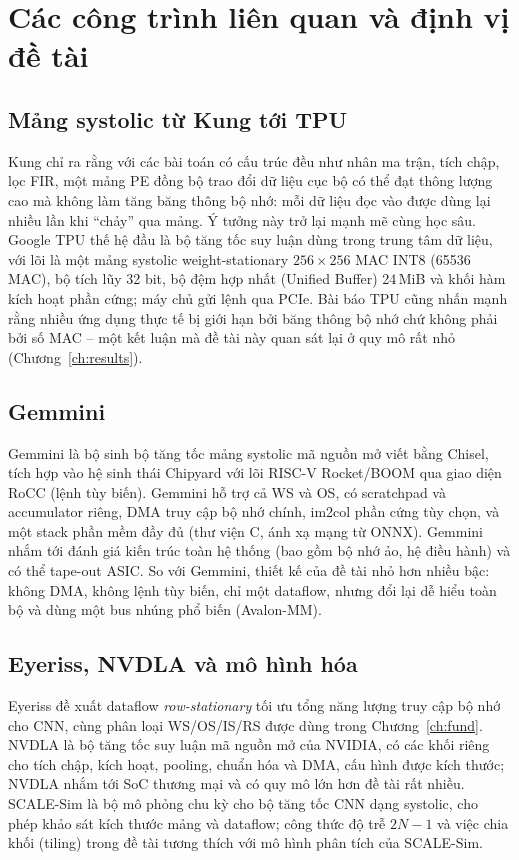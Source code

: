 \chapter{Các công trình liên quan và định vị đề tài}
\label{ch:related}

\section{Mảng systolic từ Kung tới TPU}
Kung \cite{kung1982} chỉ ra rằng với các bài toán có cấu trúc đều như nhân ma trận, tích chập, lọc FIR, một mảng PE đồng bộ trao đổi dữ liệu cục bộ có thể đạt thông lượng cao mà không làm tăng băng thông bộ nhớ: mỗi dữ liệu đọc vào được dùng lại nhiều lần khi ``chảy'' qua mảng. Ý tưởng này trở lại mạnh mẽ cùng học sâu. Google TPU thế hệ đầu \cite{jouppi2017tpu} là bộ tăng tốc suy luận dùng trong trung tâm dữ liệu, với lõi là một mảng systolic weight-stationary $256\times256$ MAC INT8 (\num{65536} MAC), bộ tích lũy 32 bit, bộ đệm hợp nhất (Unified Buffer) 24\,MiB và khối hàm kích hoạt phần cứng; máy chủ gửi lệnh qua PCIe. Bài báo TPU cũng nhấn mạnh rằng nhiều ứng dụng thực tế bị giới hạn bởi băng thông bộ nhớ chứ không phải bởi số MAC -- một kết luận mà đề tài này quan sát lại ở quy mô rất nhỏ (Chương~\ref{ch:results}).

\section{Gemmini}
Gemmini \cite{genc2021gemmini} là bộ sinh bộ tăng tốc mảng systolic mã nguồn mở viết bằng Chisel, tích hợp vào hệ sinh thái Chipyard với lõi RISC-V Rocket/BOOM qua giao diện RoCC (lệnh tùy biến). Gemmini hỗ trợ cả WS và OS, có scratchpad và accumulator riêng, DMA truy cập bộ nhớ chính, im2col phần cứng tùy chọn, và một stack phần mềm đầy đủ (thư viện C, ánh xạ mạng từ ONNX). Gemmini nhắm tới đánh giá kiến trúc toàn hệ thống (bao gồm bộ nhớ ảo, hệ điều hành) và có thể tape-out ASIC. So với Gemmini, thiết kế của đề tài nhỏ hơn nhiều bậc: không DMA, không lệnh tùy biến, chỉ một dataflow, nhưng đổi lại dễ hiểu toàn bộ và dùng một bus nhúng phổ biến (Avalon-MM).

\section{Eyeriss, NVDLA và mô hình hóa}
Eyeriss \cite{chen2016eyeriss,chen2017eyerissjssc} đề xuất dataflow \emph{row-stationary} tối ưu tổng năng lượng truy cập bộ nhớ cho CNN, cùng phân loại WS/OS/IS/RS được dùng trong Chương~\ref{ch:fund}. NVDLA \cite{nvdla} là bộ tăng tốc suy luận mã nguồn mở của NVIDIA, có các khối riêng cho tích chập, kích hoạt, pooling, chuẩn hóa và DMA, cấu hình được kích thước; NVDLA nhắm tới SoC thương mại và có quy mô lớn hơn đề tài rất nhiều. SCALE-Sim \cite{samajdar2018scalesim} là bộ mô phỏng chu kỳ cho bộ tăng tốc CNN dạng systolic, cho phép khảo sát kích thước mảng và dataflow; công thức độ trễ $2N-1$ và việc chia khối (tiling) trong đề tài tương thích với mô hình phân tích của SCALE-Sim.


